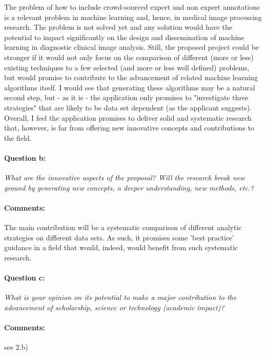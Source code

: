 \documentclass[serif, twocolumn, numeric, rga]{jote-article}
\begin{document}
The problem of how to include crowd-sourced expert and non expert annotations is a relevant problem in machine learning and, hence, in medical image processing research. The problem is not solved yet and any solution would have the potential to impact significantly on the design and dissemination of machine learning in diagnostic clinical image analysis. Still, the proposed project could be stronger if it would not only focus on the comparison of different (more or less) existing techniques to a few selected (and more or less well defined) problems, but would promise to contribute to the advancement of related machine learning algorithms itself. I would see that generating these algorithms may be a natural second step, but - as it is - the application only promises to "investigate three strategies" that are likely to be data set dependent (as the applicant suggests). Overall, I feel the application promises to deliver solid and systematic research that, however, is far from offering new innovative concepts and contributions to the field.

\paragraph{Question b:}
\textit{What are the innovative aspects of the proposal? Will the research break new ground by generating new concepts, a deeper understanding, new methods, etc.?}

\paragraph{Comments:}

The main contribution will be a systematic comparison of different analytic strategies on different data sets. As such, it promises some 'best practice' guidance in a field that would, indeed, would benefit from such systematic research.

\paragraph{Question c:}
\textit{What is your opinion on its potential to make a major contribution to the advancement of scholarship, science or technology (academic impact)?}

\paragraph{Comments:}

see 2.b)
\end{document}
